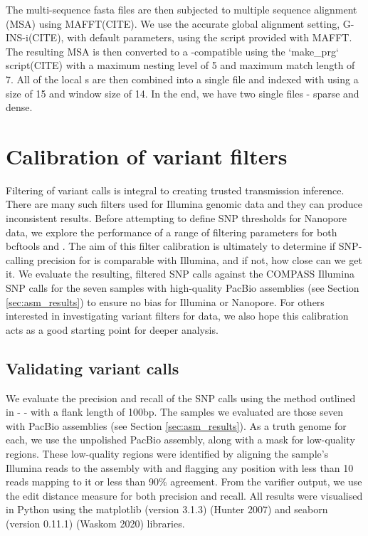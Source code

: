 The multi-sequence fasta files are then subjected to multiple sequence alignment (MSA) using MAFFT(CITE). We use the accurate global alignment setting, G-INS-i(CITE), with default parameters, using the  script provided with MAFFT. The resulting MSA is then converted to a \pandora{}-compatible \prg{} using the `make\_prg` script(CITE) with a maximum nesting level of 5 and maximum match length of 7. All of the local \prg{}s are then combined into a single \prg{} file and indexed with \pandora{} using a \kmer{} size of 15 and window size of 14. In the end, we have two single \prg{} files - sparse and dense.


\section{Calibration of \ont{} variant filters}

Filtering of variant calls is integral to creating trusted transmission
inference. There are many such filters used for Illumina genomic data
and they can produce inconsistent results\cite{walter2020}. Before
attempting to define SNP thresholds for Nanopore data, we explore the
performance of a range of filtering parameters for both bcftools and \pandora{}.  
The aim of this filter calibration is ultimately to determine if SNP-calling precision for \ont{} is comparable with Illumina, and if not, how close can we get it.
We evaluate the resulting, filtered SNP calls
against the COMPASS Illumina SNP calls for the seven
samples with high-quality PacBio assemblies (see Section \autoref{sec:asm_results}) to ensure no bias for
Illumina or Nanopore.
For others interested in investigating variant filters for \ont{} data, we also hope this calibration acts as a good starting point for deeper analysis.

\subsection{Validating variant calls}

We evaluate the precision and recall of the SNP calls using the method outlined in  -  - with a flank length of 100bp. The samples we evaluated are those seven with PacBio assemblies (see Section \autoref{sec:asm_results}). As a truth genome for each, we use the unpolished  PacBio assembly, along with a mask for low-quality regions. These low-quality regions were identified by aligning the sample's Illumina reads to the assembly with  and flagging any position with less than 10 reads mapping to it or less than 90\% agreement. From the varifier output, we use the edit distance measure for both precision and recall. All results were visualised in Python using the matplotlib (version 3.1.3) (Hunter 2007) and seaborn (version 0.11.1) (Waskom 2020) libraries.

